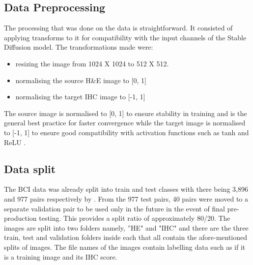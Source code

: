 \subsection{Data Preprocessing}

The processing that was done on the data is straightforward. It consisted of applying transforms to it for compatibility with the input channels of the Stable Diffusion model. The transformations made were:

\begin{itemize}
    \item resizing the image from 1024 X 1024 to 512 X 512.
    \item normalising the source H\&E image to [0, 1]
    \item normalising the target IHC image to [-1, 1]
\end{itemize}

The source image is normalised to [0, 1] to ensure stability in training and is the general best practice for faster convergence while the target image is normalised to [-1, 1] to ensure good compatibility with activation functions such as tanh and ReLU  \parencite{Goodfellow2016DeepLearning}.

\subsection{Data split}

The BCI data was already split into train and test classes with there being 3,896 and 977 pairs respectively by \parencite{Liu2022BCI:Pix2pix}. From the 977 test pairs, 40 pairs were moved to a separate validation pair to be used only in the future in the event of final pre-production testing. This provides a split ratio of approximately 80/20. The images are split into two folders namely, ''HE" and "IHC" and there are the three train, test and validation folders inside each that all contain the afore-mentioned splits of images. The file names of the images contain labelling data such as if it is a training image and its IHC score.

